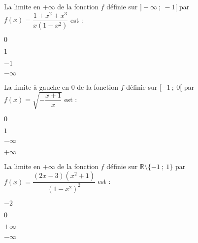 \begin{QCM}
  \begin{GroupeQCM}
    \begin{exercice}
      La limite en $+\infty$ de la fonction $f$ définie sur $]-\infty~;~-1[$ par $f(x)=\dfrac{1+x^2+x^3}{x\left(1-x^2\right)}$ est :
      \begin{ChoixQCM}{4}
      \item $0$
      \item $1$
      \item $-1$
      \item $-\infty$
      \end{ChoixQCM}
\begin{corrige}
   \end{corrige}
    \end{exercice}

    \begin{exercice}
      La limite à gauche  en $0$  de la fonction $f$ définie sur $[-1~;~0[$ par $f(x)=\sqrt{-\dfrac{x+1}{x}}$ est :
      \begin{ChoixQCM}{4}
      \item $0$
      \item $1$
      \item $-\infty$
      \item $+\infty$
      \end{ChoixQCM}
      \begin{corrige}
   \end{corrige}
    \end{exercice}

    \begin{exercice}
      La limite en $+\infty$ de la fonction $f$ définie sur $\mathbb{R}\setminus\{-1~;~1\}$ par $f(x)=\dfrac{(2x-3)(x^2+1)}{\left(1-x^2\right)^2}$ est :
      \begin{ChoixQCM}{4}
      \item $-2$
      \item $0$
      \item $+\infty$
      \item $-\infty$
      \end{ChoixQCM}
      \begin{corrige}
   \end{corrige}
    \end{exercice}
  \end{GroupeQCM}
\end{QCM}


